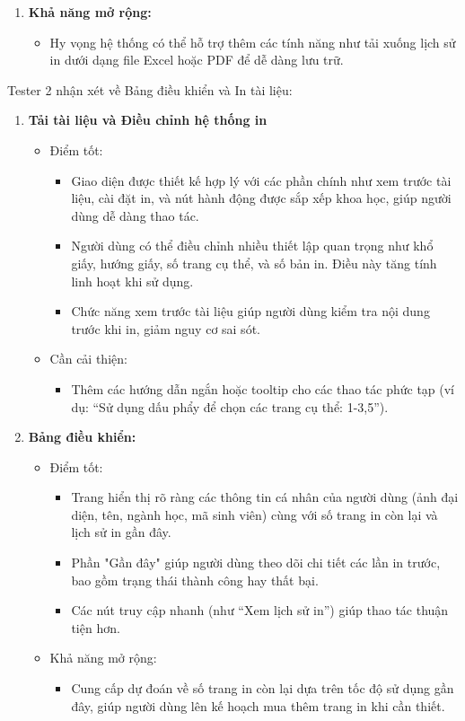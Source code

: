 \begin{itemize}
\begin{enumerate}
    \item \textbf{Khả năng mở rộng:}
    \begin{itemize}
        \item Hy vọng hệ thống có thể hỗ trợ thêm các tính năng như tải xuống lịch sử in dưới dạng file Excel hoặc PDF để dễ dàng lưu trữ.
    \end{itemize}
\end{enumerate}
  Tester 2 nhận xét về Bảng điều khiển và In tài liệu:
  \begin{enumerate}
      \item \textbf{Tải tài liệu và Điều chỉnh hệ thống in}
      \begin{itemize}
          \item Điểm tốt:
          \begin{itemize}
              \item Giao diện được thiết kế hợp lý với các phần chính như xem trước tài liệu, cài đặt in, và nút hành động được sắp xếp khoa học, giúp người dùng dễ dàng thao tác.
              \item Người dùng có thể điều chỉnh nhiều thiết lập quan trọng như khổ giấy, hướng giấy, số trang cụ thể, và số bản in. Điều này tăng tính linh hoạt khi sử dụng.
              \item Chức năng xem trước tài liệu giúp người dùng kiểm tra nội dung trước khi in, giảm nguy cơ sai sót.
          \end{itemize}
          \item Cần cải thiện:
          \begin{itemize}
              \item Thêm các hướng dẫn ngắn hoặc tooltip cho các thao tác phức tạp (ví dụ: “Sử dụng dấu phẩy để chọn các trang cụ thể: 1-3,5”).
          \end{itemize}
      \end{itemize}
      \item \textbf{Bảng điều khiển:}
      \begin{itemize}
          \item Điểm tốt:
          \begin{itemize}
              \item Trang hiển thị rõ ràng các thông tin cá nhân của người dùng (ảnh đại diện, tên, ngành học, mã sinh viên) cùng với số trang in còn lại và lịch sử in gần đây.
              \item Phần "Gần đây" giúp người dùng theo dõi chi tiết các lần in trước, bao gồm trạng thái thành công hay thất bại.
              \item Các nút truy cập nhanh (như “Xem lịch sử in”) giúp thao tác thuận tiện hơn.
          \end{itemize}
          \item Khả năng mở rộng:
          \begin{itemize}
              \item Cung cấp dự đoán về số trang in còn lại dựa trên tốc độ sử dụng gần đây, giúp người dùng lên kế hoạch mua thêm trang in khi cần thiết.
          \end{itemize}
      \end{itemize}
      

\end{enumerate}
\end{itemize}
